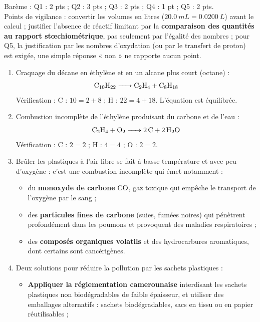 \documentclass[11pt]{article}
\begin{document}
\begin{attention}
Barème : Q1 : 2 pts ; Q2 : 3 pts ; Q3 : 2 pts ; Q4 : 1 pt ; Q5 : 2 pts.\\
Points de vigilance : convertir les volumes en litres ($\SI{20,0}{mL} = \SI{0,0200}{L}$) avant le calcul ; justifier l'absence de réactif limitant par la \textbf{comparaison des quantités au rapport stœchiométrique}, pas seulement par l'égalité des nombres ; pour Q5, la justification par les nombres d'oxydation (ou par le transfert de proton) est exigée, une simple réponse « non » ne rapporte aucun point.
\end{attention}

\begin{corrige}
\begin{enumerate}
    \item Craquage du décane en éthylène et en un alcane plus court (octane) :
    \[ \ce{C10H22 -> C2H4 + C8H18} \]
    Vérification : C : $10 = 2 + 8$ ; H : $22 = 4 + 18$. L'équation est équilibrée.
    \item Combustion incomplète de l'éthylène produisant du carbone et de l'eau :
    \[ \ce{C2H4 + O2 -> 2C + 2H2O} \]
    Vérification : C : $2 = 2$ ; H : $4 = 4$ ; O : $2 = 2$.
    \item Brûler les plastiques à l'air libre se fait à basse température et avec peu d'oxygène : c'est une combustion incomplète qui émet notamment :
    \begin{itemize}
        \item du \textbf{monoxyde de carbone} $\ce{CO}$, gaz toxique qui empêche le transport de l'oxygène par le sang ;
        \item des \textbf{particules fines de carbone} (suies, fumées noires) qui pénètrent profondément dans les poumons et provoquent des maladies respiratoires ;
        \item des \textbf{composés organiques volatils} et des hydrocarbures aromatiques, dont certains sont cancérigènes.
    \end{itemize}
    \item Deux solutions pour réduire la pollution par les sachets plastiques :
    \begin{itemize}
        \item \textbf{Appliquer la réglementation camerounaise} interdisant les sachets plastiques non biodégradables de faible épaisseur, et utiliser des emballages alternatifs : sachets biodégradables, sacs en tissu ou en papier réutilisables ;

\end{itemize}
\end{enumerate}
\end{corrige}
\end{document}
